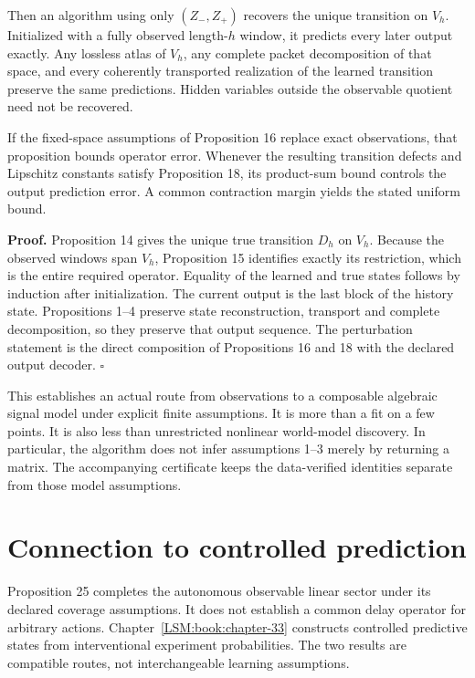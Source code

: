 Then an algorithm using only \((Z_-,Z_+)\) recovers the unique
transition on \(V_h\). Initialized with a fully observed length-\(h\)
window, it predicts every later output exactly. Any lossless atlas of
\(V_h\), any complete packet decomposition of that space, and every
coherently transported realization of the learned transition preserve
the same predictions. Hidden variables outside the observable quotient
need not be recovered.

If the fixed-space assumptions of Proposition 16 replace exact
observations, that proposition bounds operator error. Whenever the
resulting transition defects and Lipschitz constants satisfy Proposition
18, its product-sum bound controls the output prediction error. A common
contraction margin yields the stated uniform bound.

\textbf{Proof.} Proposition 14 gives the unique true transition \(D_h\)
on \(V_h\). Because the observed windows span \(V_h\), Proposition 15
identifies exactly its restriction, which is the entire required
operator. Equality of the learned and true states follows by induction
after initialization. The current output is the last block of the
history state. Propositions 1--4 preserve state reconstruction,
transport and complete decomposition, so they preserve that output
sequence. The perturbation statement is the direct composition of
Propositions 16 and 18 with the declared output decoder. \(\square\)

This establishes an actual route from observations to a composable
algebraic signal model under explicit finite assumptions. It is more
than a fit on a few points. It is also less than unrestricted nonlinear
world-model discovery. In particular, the algorithm does not infer
assumptions 1--3 merely by returning a matrix. The accompanying
certificate keeps the data-verified identities separate from those model
assumptions.

\section{Connection to controlled prediction}\label{LSM:connection-to-controlled-prediction}

Proposition 25 completes the autonomous observable linear sector under
its declared coverage assumptions. It does not establish a common delay
operator for arbitrary actions. Chapter~\ref{LSM:book:chapter-33} constructs controlled
predictive states from interventional experiment probabilities. The two
results are compatible routes, not interchangeable learning assumptions.


